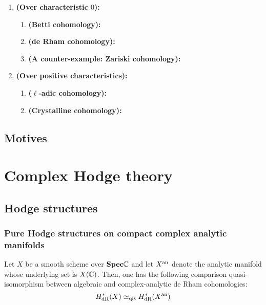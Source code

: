                 \begin{example}
                    \noindent
                    \begin{enumerate}
                        \item \textbf{(Over characteristic $0$):} 
                            \begin{enumerate}
                                \item \textbf{(Betti cohomology):}
                                \item \textbf{(de Rham cohomology):}
                                \item \textbf{(A counter-example: Zariski cohomology):}
                            \end{enumerate}
                        \item \textbf{(Over positive characteristics):}
                            \begin{enumerate}
                                \item \textbf{($\ell$-adic cohomology):}
                                \item \textbf{(Crystalline cohomology):}
                            \end{enumerate}
                    \end{enumerate}
                \end{example}
        
        \subsection{Motives}
    
    \section{Complex Hodge theory}
        \subsection{Hodge structures}
            \subsubsection{Pure Hodge structures on compact complex analytic manifolds}
                \begin{theorem} \label{theorem: de_rham_cohomology}
                    Let $X$ be a smooth scheme over $\mathbf{Spec} \mathbb{C}$ and let $X^{\mathrm{an}}$ denote the analytic manifold whose underlying set is $X(\mathbb{C})$. Then, one has the following comparison quasi-isomorphism between algebraic and complex-analytic de Rham cohomologies:
                        $$H^*_{\mathrm{dR}}(X) \simeq_{\mathrm{qis}} H^*_{\mathrm{dR}}(X^{\mathrm{an}})$$
                \end{theorem}
            
